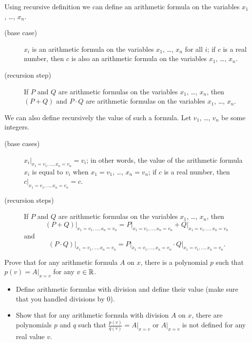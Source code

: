 \begin{chapterendexercises}
    \exercise[recommended]
        Using recursive definition we can define an arithmetic formula on the
        variables $x_1$, \dots, $x_n$.
        \begin{description}
            \item [(base case)] $x_i$ is an arithmetic formula on the variables $x_1$,
                \dots, $x_n$ for all $i$; if $c$ is a real number, then $c$ is also
                an arithmetic formula on the variables $x_1$, \dots, $x_n$.
            \item[(recursion step)] If $P$ and $Q$ are arithmetic formulas on the variables
                $x_1$, \dots, $x_n$, then $(P + Q)$ and $P \cdot Q$ are arithmetic formulas
                on the variables $x_1$, \dots, $x_n$.
        \end{description}

        We can also define recursively the value of such a formula.
        Let $v_1$, \dots, $v_n$ be some integers.
        \begin{description}
            \item[(base cases)] $x_i\big\rvert_{x_1 = v_1, \dots, x_n = v_n} = v_i$; in
                other words, the value of the arithmetic formula $x_i$ is equal to $v_i$
                when $x_1 = v_1$, \dots, $x_n = v_n$; if $c$ is a real number, then
                $c\rvert_{x_1 = v_1, \dots, x_n = v_n} = c$.
            \item[(recursion steps)] If $P$ and $Q$ are arithmetic formulas on the
            variables $x_1$, \dots, $x_n$, then
            \[
                (P + Q)\big\rvert_{x_1 = v_1, \dots, x_n = v_n} =
                P\big\rvert_{x_1 = v_1, \dots, x_n = v_n} +
                Q\big\rvert_{x_1 = v_1, \dots, x_n = v_n}
            \]
            and
            \[
                (P \cdot Q)\big\rvert_{x_1 = v_1, \dots, x_n = v_n} =
                P\big\rvert_{x_1 = v_1, \dots, x_n = v_n} \cdot
                Q\big\rvert_{x_1 = v_1, \dots, x_n = v_n}.
            \]
        \end{description}

        Prove that for any arithmetic formula $A$ on $x$, there is a polynomial
        $p$ such that $p(v) = A\big\rvert_{x = v}$ for any $v \in {\mathbb{R}}$.
    \exercise
        \begin{itemize}
            \item Define arithmetic formulas with division and define their value (make
                sure that you handled divisions by $0$).

            \item Show that for any arithmetic formula with division $A$ on $x$,
                there are polynomials $p$ and $q$ such that $\frac{p(v)}{q(v)} =
                A\big\rvert_{x = v}$ or $A\big\rvert_{x = v}$ is not defined for
                any real value $v$.
        \end{itemize}
\end{chapterendexercises}
